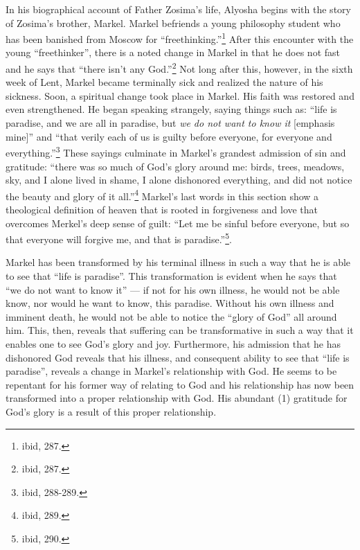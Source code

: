 	In his biographical account of Father Zosima's life, Alyosha begins with the story of Zosima's brother, Markel. Markel befriends a young philosophy student who has been banished from Moscow for ``freethinking.''\footnote{ibid, 287.} After this encounter with the young ``freethinker'', there is a noted change in Markel in that he does not fast and he says that ``there isn't any God.''\footnote{ibid, 287.} Not long after this, however, in the sixth week of Lent, Markel became terminally sick and realized the nature of his sickness. Soon, a spiritual change took place in Markel. His faith was restored and even strengthened. He began speaking strangely, saying things such as: ``life is paradise, and we are all in paradise, but \emph{we do not want to know it} [emphasis mine]'' and ``that verily each of us is guilty before everyone, for everyone and everything.''\footnote{ibid, 288-289.} These sayings culminate in Markel's grandest admission of sin and gratitude: ``there was so much of God's glory around me: birds, trees, meadows, sky, and I alone lived in shame, I alone dishonored everything, and did not notice the beauty and glory of it all.''\footnote{ibid, 289.} Markel's last words in this section show a theological definition of heaven that is rooted in forgiveness and love that overcomes Merkel's deep sense of guilt: ``Let me be sinful before everyone, but so that everyone will forgive me, and that is paradise.''\footnote{ibid, 290.}.
  
  Markel has been transformed by his terminal illness in such a way that he is able to see that ``life is paradise''. This transformation is evident when he says that ``we do not want to know it'' --- if not for his own illness, he would not be able know, nor would he want to know, this paradise. Without his own illness and imminent death, he would not be able to notice the ``glory of God'' all around him. This, then, reveals that suffering can be transformative in such a way that it enables one to see God's glory and joy. Furthermore, his admission that he has dishonored God reveals that his illness, and consequent ability to see that ``life is paradise'', reveals a change in Markel's relationship with God. He seems to be repentant for his former way of relating to God and his relationship has now been transformed into a proper relationship with God. His abundant (1) gratitude for God's glory is a result of this proper relationship.
  

